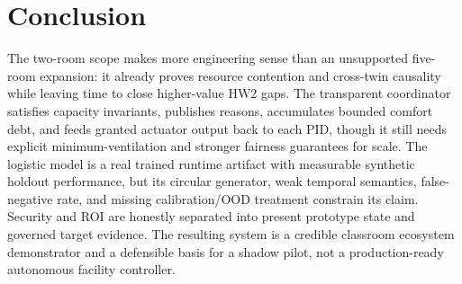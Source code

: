\section{Conclusion}
The two-room scope makes more engineering sense than an unsupported five-room expansion: it already proves resource contention and cross-twin causality while leaving time to close higher-value HW2 gaps. The transparent coordinator satisfies capacity invariants, publishes reasons, accumulates bounded comfort debt, and feeds granted actuator output back to each PID, though it still needs explicit minimum-ventilation and stronger fairness guarantees for scale. The logistic model is a real trained runtime artifact with measurable synthetic holdout performance, but its circular generator, weak temporal semantics, false-negative rate, and missing calibration/OOD treatment constrain its claim. Security and ROI are honestly separated into present prototype state and governed target evidence. The resulting system is a credible classroom ecosystem demonstrator and a defensible basis for a shadow pilot, not a production-ready autonomous facility controller.
